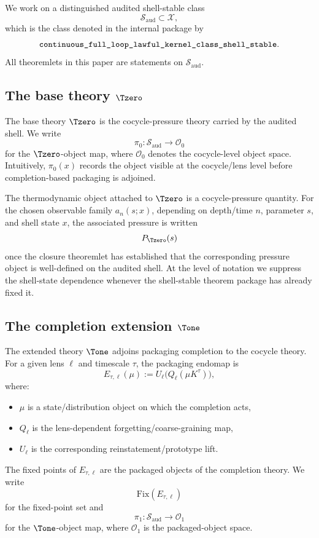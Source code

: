 We work on a distinguished audited shell-stable class
\[
\mathcal{S}_{\mathrm{aud}}\subset \mathcal{X},
\]
which is the class denoted in the internal package by
\[
\texttt{continuous\_full\_loop\_lawful\_kernel\_class\_shell\allowbreak\_stable}.
\]
All theoremlets in this paper are statements on \(\mathcal{S}_{\mathrm{aud}}\).

\subsection{The base theory \texorpdfstring{$\Tzero$}{T0}}

The base theory \(\Tzero\) is the cocycle-pressure theory carried by the audited shell. We write
\[
\pi_0:\mathcal{S}_{\mathrm{aud}}\to \mathcal{O}_0
\]
for the \(\Tzero\)-object map, where \(\mathcal{O}_0\) denotes the cocycle-level object space. Intuitively, \(\pi_0(x)\) records the object visible at the cocycle/lens level before completion-based packaging is adjoined.

The thermodynamic object attached to \(\Tzero\) is a cocycle-pressure quantity. For the chosen observable family \(a_n(s;x)\), depending on depth/time \(n\), parameter \(s\), and shell state \(x\), the associated pressure is written
\[
P_{\Tzero}(s)
\]
once the closure theoremlet has established that the corresponding pressure object is well-defined on the audited shell. At the level of notation we suppress the shell-state dependence whenever the shell-stable theorem package has already fixed it.

\subsection{The completion extension \texorpdfstring{$\Tone$}{T1}}

The extended theory \(\Tone\) adjoins packaging completion to the cocycle theory. For a given lens \(\ell\) and timescale \(\tau\), the packaging endomap is
\[
E_{\tau,\ell}(\mu):=U_{\ell}\!\bigl(Q_{\ell}(\mu K^{\tau})\bigr),
\]
where:
\begin{itemize}
    \item \(\mu\) is a state/distribution object on which the completion acts,
    \item \(Q_{\ell}\) is the lens-dependent forgetting/coarse-graining map,
    \item \(U_{\ell}\) is the corresponding reinstatement/prototype lift.
\end{itemize}
The fixed points of \(E_{\tau,\ell}\) are the packaged objects of the completion theory. We write
\[
\mathrm{Fix}(E_{\tau,\ell})
\]
for the fixed-point set and
\[
\pi_1:\mathcal{S}_{\mathrm{aud}}\to \mathcal{O}_1
\]
for the \(\Tone\)-object map, where \(\mathcal{O}_1\) is the packaged-object space.

